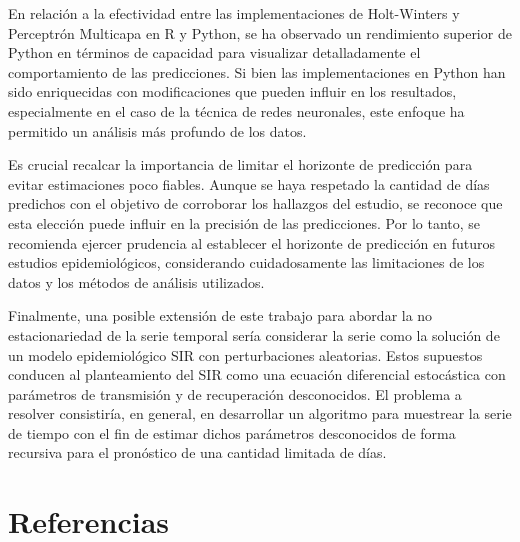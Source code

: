 \documentclass[
  us-letterpaper,
]{scrreprt}
\theoremstyle{plain}
\theoremstyle{definition}
\theoremstyle{definition}
\theoremstyle{plain}
\theoremstyle{remark}
\begin{document}
En relación a la efectividad entre las implementaciones de Holt-Winters
y Perceptrón Multicapa en R y Python, se ha observado un rendimiento
superior de Python en términos de capacidad para visualizar
detalladamente el comportamiento de las predicciones. Si bien las
implementaciones en Python han sido enriquecidas con modificaciones que
pueden influir en los resultados, especialmente en el caso de la técnica
de redes neuronales, este enfoque ha permitido un análisis más profundo
de los datos.

Es crucial recalcar la importancia de limitar el horizonte de predicción
para evitar estimaciones poco fiables. Aunque se haya respetado la
cantidad de días predichos con el objetivo de corroborar los hallazgos
del estudio, se reconoce que esta elección puede influir en la precisión
de las predicciones. Por lo tanto, se recomienda ejercer prudencia al
establecer el horizonte de predicción en futuros estudios
epidemiológicos, considerando cuidadosamente las limitaciones de los
datos y los métodos de análisis utilizados.

Finalmente, una posible extensión de este trabajo para abordar la no
estacionariedad de la serie temporal sería considerar la serie como la
solución de un modelo epidemiológico SIR con perturbaciones aleatorias.
Estos supuestos conducen al planteamiento del SIR como una ecuación
diferencial estocástica con parámetros de transmisión y de recuperación
desconocidos. El problema a resolver consistiría, en general, en
desarrollar un algoritmo para muestrear la serie de tiempo con el fin de
estimar dichos parámetros desconocidos de forma recursiva para el
pronóstico de una cantidad limitada de días.


\chapter*{Referencias}\label{referencias}

\end{document}
